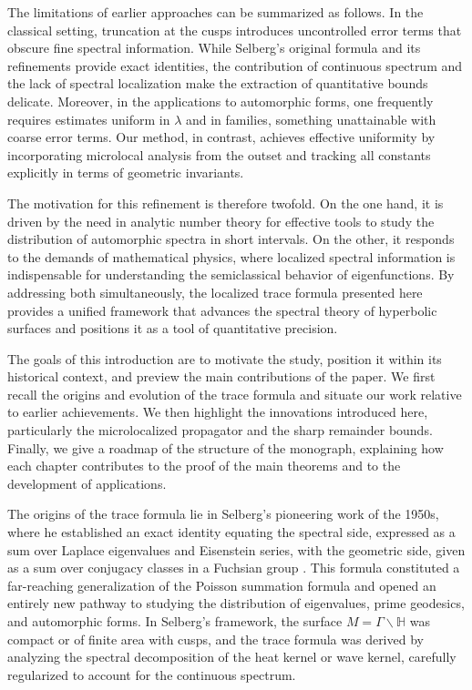 The limitations of earlier approaches can be summarized as follows. In the
classical setting, truncation at the cusps introduces uncontrolled error terms
that obscure fine spectral information. While Selberg’s original formula and
its refinements provide exact identities, the contribution of continuous
spectrum and the lack of spectral localization make the extraction of
quantitative bounds delicate. Moreover, in the applications to automorphic
forms, one frequently requires estimates uniform in $\lambda$ and in families,
something unattainable with coarse error terms. Our method, in contrast,
achieves effective uniformity by incorporating microlocal analysis from the
outset and tracking all constants explicitly in terms of geometric invariants.

The motivation for this refinement is therefore twofold. On the one hand, it
is driven by the need in analytic number theory for effective tools to study
the distribution of automorphic spectra in short intervals. On the other, it
responds to the demands of mathematical physics, where localized spectral
information is indispensable for understanding the semiclassical behavior of
eigenfunctions. By addressing both simultaneously, the localized trace formula
presented here provides a unified framework that advances the spectral theory
of hyperbolic surfaces and positions it as a tool of quantitative precision.

The goals of this introduction are to motivate the study, position it within
its historical context, and preview the main contributions of the paper. We
first recall the origins and evolution of the trace formula and situate our
work relative to earlier achievements. We then highlight the innovations
introduced here, particularly the microlocalized propagator and the sharp
remainder bounds. Finally, we give a roadmap of the structure of the
monograph, explaining how each chapter contributes to the proof of the main
theorems and to the development of applications.

The origins of the trace formula lie in Selberg’s pioneering work of the 1950s,
where he established an exact identity equating the spectral side, expressed as
a sum over Laplace eigenvalues and Eisenstein series, with the geometric side,
given as a sum over conjugacy classes in a Fuchsian group \cite{Selberg1956}.
This formula constituted a far-reaching generalization of the Poisson
summation formula and opened an entirely new pathway to studying the
distribution of eigenvalues, prime geodesics, and automorphic forms. In
Selberg’s framework, the surface $M=\Gamma\backslash\mathbb{H}$ was compact or
of finite area with cusps, and the trace formula was derived by analyzing the
spectral decomposition of the heat kernel or wave kernel, carefully regularized
to account for the continuous spectrum.

